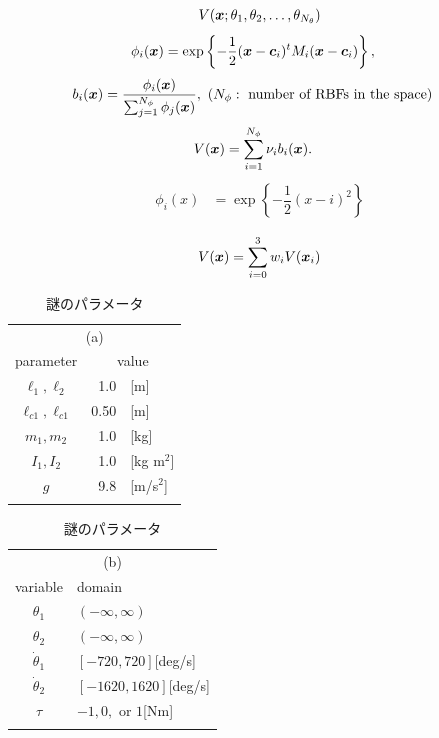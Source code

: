 \begin{align}
V(\boldsymbol{x};\theta_1,\theta_2,\dots,\theta_{N_\theta}) \nonumber
\end{align}
\begin{align}
\phi_i(\boldsymbol{x}) &= \exp \left\{-\dfrac{1}{2}(\boldsymbol{x} - \boldsymbol{c}_i)^t M_i (\boldsymbol{x} - \boldsymbol{c}_i) \right\},
\end{align}
\begin{align}
b_i(\boldsymbol{x}) &= \dfrac{\phi_i(\boldsymbol{x})}{\sum_{j=1}^{N_\phi} \phi_j(\boldsymbol{x})}, \ (N_\phi: \text{ number of RBFs in the space})
\end{align}
\begin{align}
V(\boldsymbol{x}) &= \sum_{i=1}^{N_\phi} \nu_i b_i(\boldsymbol{x}). \label{eq:rbf_weighted_sum}
\end{align}
\begin{align}
\phi_i(x) &= \exp \left\{-\dfrac{1}{2}(x - i)^2 \right\} \nonumber
\end{align}

\begin{align}
V(\boldsymbol{x}) = \sum_{i=0}^3 w_i V(\boldsymbol{x}_i)
\end{align}


\begin{table}[htbp]
        \begin{center}
	\caption{謎のパラメータ}
        \label{table:parameter_value}
\begin{footnotesize}
\begin{minipage}{12em}
        \begin{tabular}{c|rl}
\multicolumn{3}{c}{(a)}\\
        \thline
parameter & \multicolumn{2}{c}{value} \\
        \hline
$\ell_1,\ell_2$ & 1.0&[m] \\
$\ell_{c1},\ell_{c1}$ & 0.50&[m] \\
$m_1,m_2$ & 1.0&[kg] \\
$I_1,I_2$ & 1.0&[kg m$^2$] \\
$g$ & 9.8&[m/s$^2$] \\
   \thline
  \end{tabular}
\end{minipage}
\hspace{2em}
\begin{minipage}{12em}
        \begin{tabular}{c|l}
\multicolumn{2}{c}{(b)}\\
        \thline
variable & domain \\
        \hline
$\theta_1$ & $(-\infty,\infty)$ \\
$\theta_2$ & $(-\infty,\infty)$ \\
$\dot\theta_1$ & $[-720,720]$[deg/s] \\
$\dot\theta_2$ & $[-1620,1620]$[deg/s] \\
\hline
$\tau$ & $-1,0,$ or $1$[Nm] \\
   \thline
  \end{tabular}
\end{minipage}
\end{footnotesize}
  \end{center}
\end{table}

